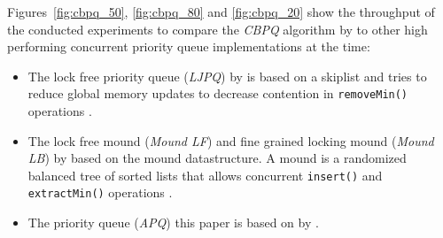 Figures~\ref{fig:cbpq_50}, \ref{fig:cbpq_80} and \ref{fig:cbpq_20} show the throughput of the conducted experiments to compare the \textit{CBPQ} algorithm by \citeauthor{braginsky_cbpq:_2016} to other high performing concurrent priority queue implementations at the time:
\begin{itemize}
	\item The lock free priority queue (\textit{LJPQ}) by \citeauthor{linden_skiplist-based_2013} is  based on a skiplist and tries to reduce global memory updates to decrease contention in \texttt{removeMin()} operations \cite{linden_skiplist-based_2013}.
	\item The lock free mound (\textit{Mound LF}) and fine grained locking mound (\textit{Mound LB}) by \citeauthor{liu_mounds:_2012} based on the mound datastructure. A mound is a randomized balanced tree
	of sorted lists that allows concurrent \texttt{insert()} and \texttt{extractMin()} operations \cite{liu_mounds:_2012}.
	\item The priority queue (\textit{APQ}) this paper is based on by \citeauthor{calciu_adaptive_2014} \cite{calciu_adaptive_2014}.
\end{itemize}

